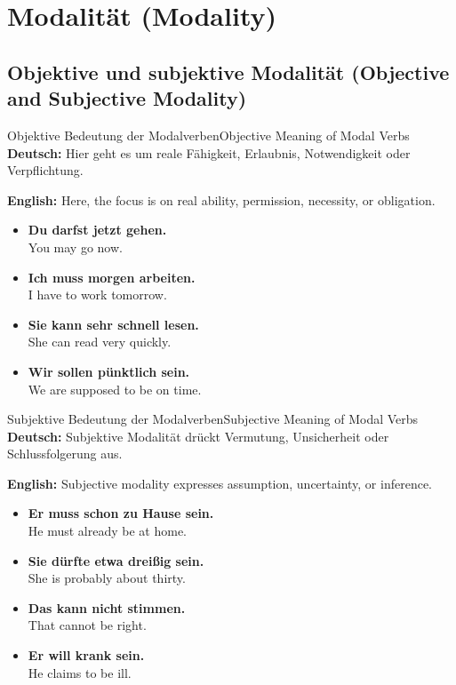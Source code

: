 \documentclass[a4paper,11pt]{article}
\newcommand{\GermanText}[1]{\textbf{Deutsch: }#1\par}
\newcommand{\EnglishText}[1]{{\color{SoftGray}\textbf{English: }#1\par}}
\newcommand{\ExampleItem}[2]{\item \textbf{#1}\\{\color{SoftGray}#2}}
\begin{document}
\section{Modalität {\small (Modality)}}

\subsection{Objektive und subjektive Modalität {\small (Objective and Subjective Modality)}}

\begin{grammarentry}{Objektive Bedeutung der Modalverben}{Objective Meaning of Modal Verbs}
    \GermanText{Hier geht es um reale Fähigkeit, Erlaubnis, Notwendigkeit oder Verpflichtung.}
    \EnglishText{Here, the focus is on real ability, permission, necessity, or obligation.}
    \begin{exbox}
        \begin{itemize}
            \ExampleItem{Du darfst jetzt gehen.}{You may go now.}
            \ExampleItem{Ich muss morgen arbeiten.}{I have to work tomorrow.}
            \ExampleItem{Sie kann sehr schnell lesen.}{She can read very quickly.}
            \ExampleItem{Wir sollen pünktlich sein.}{We are supposed to be on time.}
        \end{itemize}
    \end{exbox}
\end{grammarentry}

\begin{grammarentry}{Subjektive Bedeutung der Modalverben}{Subjective Meaning of Modal Verbs}
    \GermanText{Subjektive Modalität drückt Vermutung, Unsicherheit oder Schlussfolgerung aus.}
    \EnglishText{Subjective modality expresses assumption, uncertainty, or inference.}
    \begin{exbox}
        \begin{itemize}
            \ExampleItem{Er muss schon zu Hause sein.}{He must already be at home.}
            \ExampleItem{Sie dürfte etwa dreißig sein.}{She is probably about thirty.}
            \ExampleItem{Das kann nicht stimmen.}{That cannot be right.}
            \ExampleItem{Er will krank sein.}{He claims to be ill.}
        \end{itemize}
    \end{exbox}
\end{grammarentry}
\end{document}
